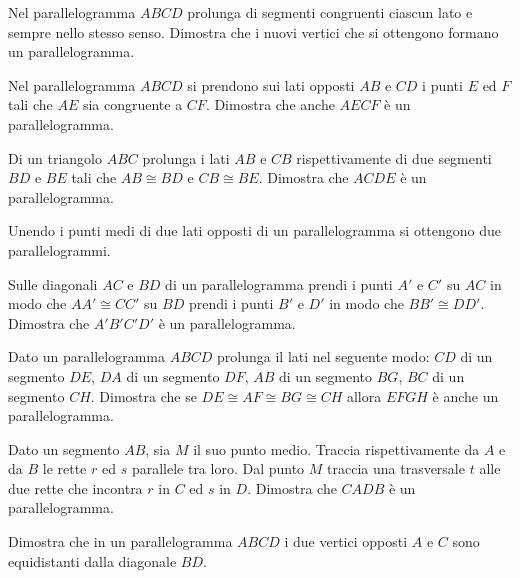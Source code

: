 \begin{multicols}{2}
\begin{esercizio}
\label{ese:4.12}
Nel parallelogramma $ABCD$ prolunga di segmenti congruenti ciascun 
lato e sempre nello stesso senso. Dimostra che i nuovi vertici che si 
ottengono formano un parallelogramma.
\end{esercizio}

\begin{esercizio}
\label{ese:4.13}
Nel parallelogramma $ABCD$ si prendono sui lati opposti $AB$ e $CD$ i 
punti $E$ ed $F$ tali che $AE$ sia congruente a $CF$. Dimostra che 
anche $AECF$ è un parallelogramma.
\end{esercizio}

\begin{esercizio}
\label{ese:4.14}
Di un triangolo $ABC$ prolunga i lati $AB$ e $CB$ rispettivamente di 
due segmenti $BD$ e $BE$ tali che $AB\cong BD$ e $CB\cong BE$. 
Dimostra che $ACDE$ è un parallelogramma.
\end{esercizio}

\begin{esercizio}
\label{ese:4.15}
Unendo i punti medi di due lati opposti di un parallelogramma si 
ottengono due parallelogrammi.
\end{esercizio}

\begin{esercizio}
\label{ese:4.16}
Sulle diagonali $AC$ e $BD$ di un parallelogramma prendi i punti $A'$ 
e $C'$ su $AC$ in modo che $AA'\cong CC'$ su $BD$ prendi i punti $B'$ 
e $D'$ in modo che $BB'\cong DD'$. Dimostra che $A'B'C'D'$ è un 
parallelogramma.
\end{esercizio}

\begin{esercizio}
\label{ese:4.17}
Dato un parallelogramma $ABCD$ prolunga il lati nel seguente modo: 
$CD$ di un segmento $DE$, $DA$ di un segmento $DF$, $AB$ di un 
segmento $BG$, $BC$ di un segmento $CH$. Dimostra che se $DE\cong 
AF\cong BG\cong CH$ allora $EFGH$ è anche un parallelogramma.
\end{esercizio}

\begin{esercizio}
\label{ese:4.18}
Dato un segmento $AB$, sia $M$ il suo punto medio. Traccia 
rispettivamente da $A$ e da $B$ le rette $r$ ed $s$ parallele tra 
loro. Dal punto $M$ traccia una trasversale $t$ alle due rette che 
incontra $r$ in $C$ ed $s$ in $D$. Dimostra che $CADB$ è un 
parallelogramma.
\end{esercizio}

\begin{esercizio}
\label{ese:4.19}
Dimostra che in un parallelogramma $ABCD$ i due vertici opposti $A$ e 
$C$ sono equidistanti dalla diagonale $BD$.
\end{esercizio}


\end{multicols}
